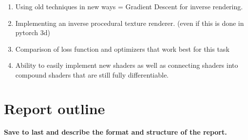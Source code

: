\begin{enumerate}
    \item Using old techniques in new ways = Gradient Descent for inverse rendering. 
    \item Implementing an inverse procedural texture renderer. (even if this is done in pytorch 3d)
    \item Comparison of loss function and optimizers that work best for this task
    \item Ability to easily implement new shaders as well as connecting shaders into compound shaders that are still fully differentiable.
\end{enumerate}

\section{Report outline}

\textbf{Save to last and describe the format and structure of the report.}


